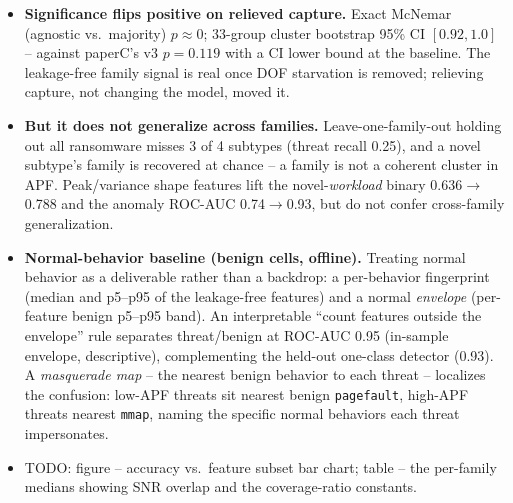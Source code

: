 \documentclass[conference]{IEEEtran}
\begin{document}
\begin{itemize}
\begin{center}
        \end{center}
  \item \textbf{Significance flips positive on relieved capture.} Exact McNemar
        (agnostic vs.\ majority) $p\approx0$; 33-group cluster bootstrap 95\% CI
        $[0.92, 1.0]$ -- against paperC's v3 $p=0.119$ with a CI lower bound at
        the baseline. The leakage-free family signal is real once DOF starvation
        is removed; relieving capture, not changing the model, moved it.
  \item \textbf{But it does not generalize across families.} Leave-one-family-out
        holding out all ransomware misses 3 of 4 subtypes (threat recall 0.25),
        and a novel subtype's family is recovered at chance -- a family is not a
        coherent cluster in APF. Peak/variance shape features lift the
        novel-\emph{workload} binary 0.636$\to$0.788 and the anomaly ROC-AUC
        0.74$\to$0.93, but do not confer cross-family generalization.
  \item \textbf{Normal-behavior baseline (benign cells, offline).} Treating normal
        behavior as a deliverable rather than a backdrop: a per-behavior
        fingerprint (median and p5--p95 of the leakage-free features) and a normal
        \emph{envelope} (per-feature benign p5--p95 band). An interpretable ``count
        features outside the envelope'' rule separates threat/benign at ROC-AUC
        0.95 (in-sample envelope, descriptive), complementing the held-out
        one-class detector (0.93). A \emph{masquerade map} -- the nearest benign
        behavior to each threat -- localizes the confusion: low-APF threats sit
        nearest benign \texttt{pagefault}, high-APF threats nearest \texttt{mmap},
        naming the specific normal behaviors each threat impersonates.
  \item TODO: figure -- accuracy vs.\ feature subset bar chart; table -- the
        per-family medians showing SNR overlap and the coverage-ratio constants.
\end{itemize}
\end{document}
